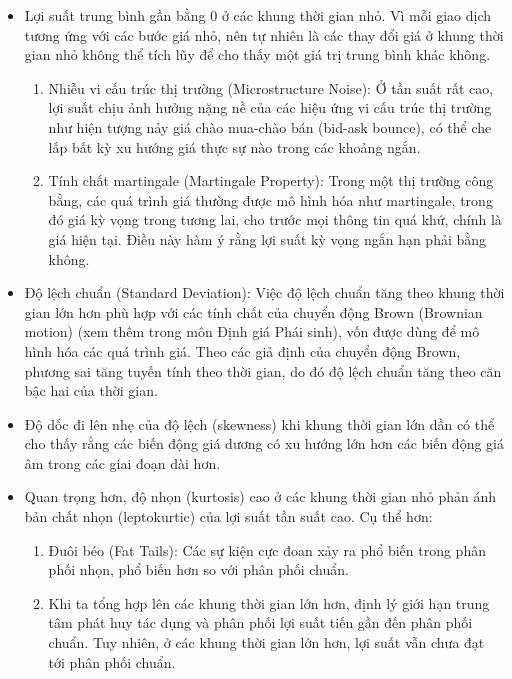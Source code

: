 \begin{itemize}
  \item Lợi suất trung bình gần bằng 0 ở các khung thời gian nhỏ. Vì mỗi giao dịch tương ứng với các bước giá nhỏ, nên tự nhiên là các thay đổi giá ở khung thời gian nhỏ không thể tích lũy để cho thấy một giá trị trung bình khác không.
  \begin{enumerate}
    \item Nhiễu vi cấu trúc thị trường (Microstructure Noise): Ở tần suất rất cao, lợi suất chịu ảnh hưởng nặng nề của các hiệu ứng vi cấu trúc thị trường như hiện tượng nảy giá chào mua-chào bán (bid-ask bounce), có thể che lấp bất kỳ xu hướng giá thực sự nào trong các khoảng ngắn.
    \item Tính chất martingale (Martingale Property): Trong một thị trường công bằng, các quá trình giá thường được mô hình hóa như martingale, trong đó giá kỳ vọng trong tương lai, cho trước mọi thông tin quá khứ, chính là giá hiện tại. Điều này hàm ý rằng lợi suất kỳ vọng ngắn hạn phải bằng không.
  \end{enumerate}
  \item Độ lệch chuẩn (Standard Deviation): Việc độ lệch chuẩn tăng theo khung thời gian lớn hơn phù hợp với các tính chất của chuyển động Brown (Brownian motion) (xem thêm trong môn Định giá Phái sinh), vốn được dùng để mô hình hóa các quá trình giá. Theo các giả định của chuyển động Brown, phương sai tăng tuyến tính theo thời gian, do đó độ lệch chuẩn tăng theo căn bậc hai của thời gian.
  \item Độ dốc đi lên nhẹ của độ lệch (skewness) khi khung thời gian lớn dần có thể cho thấy rằng các biến động giá dương có xu hướng lớn hơn các biến động giá âm trong các giai đoạn dài hơn.
  \item Quan trọng hơn, độ nhọn (kurtosis) cao ở các khung thời gian nhỏ phản ánh bản chất nhọn (leptokurtic) của lợi suất tần suất cao. Cụ thể hơn:
  \begin{enumerate}
    \item Đuôi béo (Fat Tails): Các sự kiện cực đoan xảy ra phổ biến trong phân phối nhọn, phổ biến hơn so với phân phối chuẩn.
    \item Khi ta tổng hợp lên các khung thời gian lớn hơn, định lý giới hạn trung tâm phát huy tác dụng và phân phối lợi suất tiến gần đến phân phối chuẩn. Tuy nhiên, ở các khung thời gian lớn hơn, lợi suất vẫn chưa đạt tới phân phối chuẩn.
  \end{enumerate}
\end{itemize}

